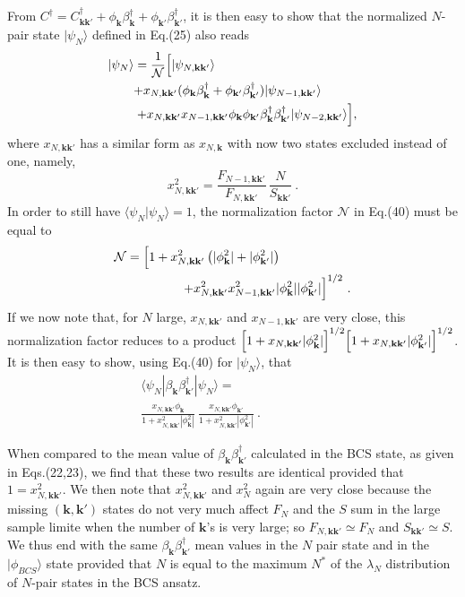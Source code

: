 \documentclass[twocolumn,showpacs]{revtex4}
\def\v#1{\mathbf{#1}}
\begin{document}
From $C^\dag=C_{\v k\v k'}^\dag+\phi_{\v k}\beta_{\v k}^\dag+\phi_{\v k'}\beta_{\v k'}^\dag$, it is then easy to show that the normalized $N$-pair state $|\psi_N\rangle$ defined in Eq.(25) also reads
\begin{eqnarray}
|\psi_N\rangle=\frac{1}{\mathcal{N}}\Big{[}|\psi_{N,\v k\v k'}\rangle\hspace{4cm}\nonumber\\
+x_{N,\v k\v k'}(\phi_{\v k}\beta_{\v k}^\dag+
\phi_{\v k'}\beta_{\v k'}^\dag)|\psi_{N-1,\v k\v k'}\rangle\hspace{1cm}\nonumber\\
+x_{N,\v k\v k'}x_{N-1,\v k\v k'}\phi_{\v k}\phi_{\v k'}\beta_{\v k}^\dag\beta_{\v k'}^\dag|\psi_{N-2,\v k\v k'}\rangle\Big{]},
\end{eqnarray}
where $x_{N,\v k\v k'}$ has a similar form as $x_{N,\v k}$ with now two states excluded instead of one, namely,
\begin{equation}
x_{N,\v k\v k'}^2=\frac{F_{N-1,\v k\v k'}}{F_{N,\v k\v k'}}\,\frac{N}{S_{\v k\v k'}}\ .
\end{equation}
In order to still have $\langle\psi_N|\psi_N\rangle=1$, the normalization factor $\mathcal{N}$ in Eq.(40) must be equal to
\begin{eqnarray}
\mathcal{N}=\Big{[}1+x_{N,\v k\v k'}^2\left(|\phi_{\v k}^2|+|\phi_{\v k'}^2|\right)\hspace{2cm}\nonumber\\
+x_{N,\v k\v k'}^2x_{N-1,\v k\v k'}^2|\phi_{\v k}^2||\phi_{\v k'}^2|\Big{]}^{1/2}\ .
\end{eqnarray}
If we now note that, for $N$ large, $x_{N,\v k\v k'}$ and $x_{N-1,\v k\v k'}$ are very close, this normalization factor reduces to a product
$\Big{[}1+x_{N,\v k\v k'}|\phi_{\v k}^2|\Big{]}^{1/2}\Big{[}1+x_{N,\v k\v k'}|\phi_{\v k'}^2|\Big{]}^{1/2}$. It is then easy to show, using Eq.(40) for $|\psi_N\rangle$, that
\begin{eqnarray}
\langle\psi_N|\beta_{\v k}\beta_{\v k'}^\dag|\psi_N\rangle=\hspace{3cm}\nonumber\\
\frac{x_{N,\v k\v k'}\phi_{\v k}}{1+x_{N,\v k\v k'}^2|\phi_{\v k}^2|}\ 
\frac{x_{N,\v k\v k'}\phi_{\v k'}}{1+x_{N,\v k\v k'}^2|\phi_{\v k'}^2|}\ .
\end{eqnarray}

When compared to the mean value of $\beta_{\v k}^{}\beta_{\v k'}^\dag$  calculated in the BCS state, as given in Eqs.(22,23), we  find that these two results are identical provided that $1=x_{N,\v k\v k'}^2$. We then note that $x_{N,\v k\v k'}^2$ and $ x_N^2$  again are very close because the missing $(\v k , \v k')$ states do not very much affect $F_N$ and the $S$ sum in the large sample limite when the number of $\v k$'s is very large; so $F_{N,\v k\v k'}\simeq F_N$ and $S_{\v k\v k'}\simeq S$. We thus end with the same $\beta_{\v k}^{}\beta_{\v k'}^\dag$ mean values in the $N$ pair state and in the $|\phi_{BCS}\rangle$ state provided that $N$ is equal to the maximum $N^\ast$ of the $\lambda_N$ distribution of $N$-pair states in the BCS ansatz.
\end{document}
